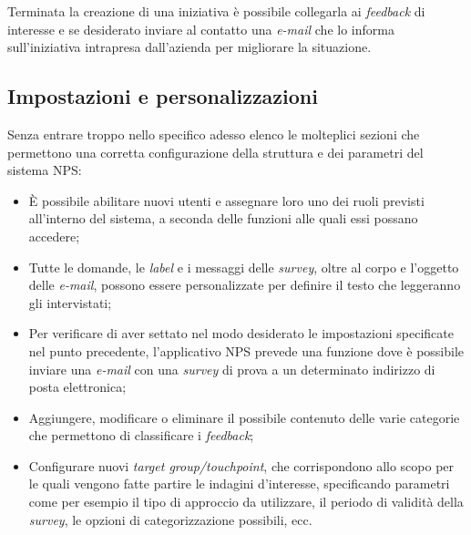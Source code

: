 Terminata la creazione di una iniziativa è possibile collegarla ai \textit{feedback} di interesse e se desiderato inviare al contatto una \textit{e-mail} che lo informa sull'iniziativa intrapresa dall'azienda per migliorare la situazione.

\subsection{Impostazioni e personalizzazioni}
Senza entrare troppo nello specifico adesso elenco le molteplici sezioni che permettono una corretta configurazione della struttura e dei parametri del sistema NPS:
\begin{itemize}
\item È possibile abilitare nuovi utenti e assegnare loro uno dei ruoli previsti all'interno del sistema, a seconda delle funzioni alle quali essi possano accedere;
\item Tutte le domande, le \textit{label} e i messaggi delle \textit{survey}, oltre al corpo e l'oggetto delle \textit{e-mail}, possono essere personalizzate per definire il testo che leggeranno gli intervistati;
\item Per verificare di aver settato nel modo desiderato le impostazioni specificate nel punto precedente, l'applicativo NPS prevede una funzione dove è possibile inviare una \textit{e-mail} con una \textit{survey} di prova a un determinato indirizzo di posta elettronica;
\item Aggiungere, modificare o eliminare il possibile contenuto delle varie categorie che permettono di classificare i \textit{feedback};
\item Configurare nuovi \textit{target group/touchpoint}, che corrispondono allo scopo per le quali vengono fatte partire le indagini d'interesse, specificando parametri come per esempio il tipo di approccio da utilizzare, il periodo di validità della \textit{survey}, le opzioni di categorizzazione possibili, ecc.
\end{itemize} 
